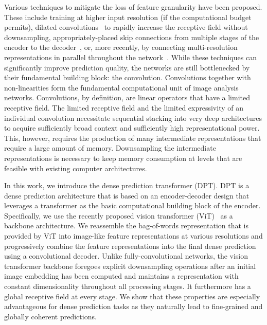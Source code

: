 \documentclass[10pt,twocolumn,letterpaper]{article}
\begin{document}
Various techniques to mitigate the loss of feature granularity have been
proposed. These include training at higher input resolution (if the
computational budget permits), dilated convolutions~\cite{Yu2016} to rapidly
increase the receptive field without downsampling, appropriately-placed skip
connections from multiple stages of the encoder to the
decoder~\cite{Ronneberger2015}, or, more recently, by connecting
multi-resolution representations in parallel throughout the
network~\cite{Wang2020}. While these techniques can significantly improve
prediction quality, the networks are still bottlenecked by their fundamental
building block: the convolution. Convolutions together with non-linearities form
the fundamental computational unit of image analysis networks. Convolutions, by
definition, are linear operators that have a limited receptive field. The
limited receptive field and the limited expressivity of an individual
convolution necessitate sequential stacking into very deep architectures
to acquire sufficiently broad context and sufficiently high
representational power. This, however, requires the production of many
intermediate representations that require a large amount of memory. Downsampling
the intermediate representations is necessary to keep memory consumption at
levels that are feasible with existing computer architectures.

In this work, we introduce the dense prediction transformer (DPT). DPT is a
dense prediction architecture that is based on an encoder-decoder design that
leverages a transformer as the basic computational building block of the
encoder. Specifically, we use the recently proposed vision transformer
(ViT)~\cite{Dosovitskiy2020} as a backbone architecture. We reassemble the
bag-of-words representation that is provided by ViT into image-like feature
representations at various resolutions and progressively combine the feature
representations into the final dense prediction using a convolutional decoder.
Unlike fully-convolutional networks, the vision transformer backbone foregoes
explicit downsampling operations after an initial image embedding has been
computed and maintains a representation with constant dimensionality throughout
all processing stages. It furthermore has a global receptive field at every
stage. We show that these properties are especially advantageous for dense
prediction tasks as they naturally lead to fine-grained and globally coherent
predictions.
\end{document}

